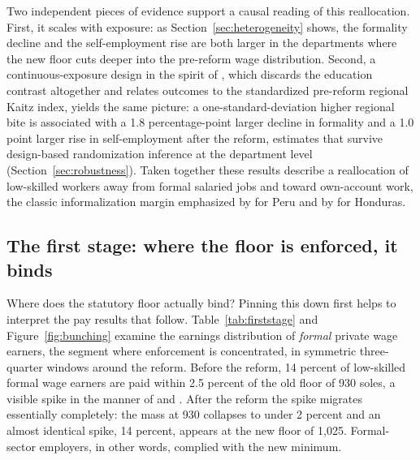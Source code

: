 Two independent pieces of evidence support a causal reading of this reallocation. First, it scales with exposure: as Section~\ref{sec:heterogeneity} shows, the formality decline and the self-employment rise are both larger in the departments where the new floor cuts deeper into the pre-reform wage distribution. Second, a continuous-exposure design in the spirit of \citet{card_1992}, which discards the education contrast altogether and relates outcomes to the standardized pre-reform regional Kaitz index, yields the same picture: a one-standard-deviation higher regional bite is associated with a 1.8 percentage-point larger decline in formality and a 1.0 point larger rise in self-employment after the reform, estimates that survive design-based randomization inference at the department level (Section~\ref{sec:robustness}). Taken together these results describe a reallocation of low-skilled workers away from formal salaried jobs and toward own-account work, the classic informalization margin emphasized by \citet{jaramillo_lopez_2006} for Peru and by \citet{ham_2018_honduras} for Honduras.



\subsection{The first stage: where the floor is enforced, it binds}

Where does the statutory floor actually bind? Pinning this down first helps to interpret the pay results that follow. Table~\ref{tab:firststage} and Figure~\ref{fig:bunching} examine the earnings distribution of \emph{formal} private wage earners, the segment where enforcement is concentrated, in symmetric three-quarter windows around the reform. Before the reform, 14 percent of low-skilled formal wage earners are paid within 2.5 percent of the old floor of 930 soles, a visible spike in the manner of \citet{cengiz_2019} and \citet{engbom_moser_2022}. After the reform the spike migrates essentially completely: the mass at 930 collapses to under 2 percent and an almost identical spike, 14 percent, appears at the new floor of 1,025. Formal-sector employers, in other words, complied with the new minimum.

